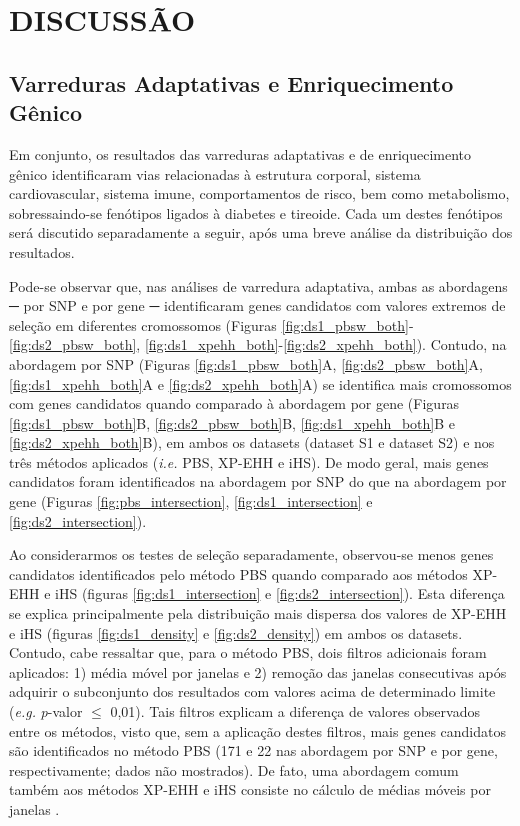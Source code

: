 
\clearpage
\section{DISCUSSÃO}
\label{sec:amazonia_discussion}

\subsection{Varreduras Adaptativas e Enriquecimento Gênico}

Em conjunto, os resultados das varreduras adaptativas e de enriquecimento gênico identificaram vias relacionadas à estrutura corporal, sistema cardiovascular, sistema imune, comportamentos de risco, bem como metabolismo, sobressaindo-se fenótipos ligados à diabetes e tireoide. Cada um destes fenótipos será discutido separadamente a seguir, após uma breve análise da distribuição dos resultados.

Pode-se observar que, nas análises de varredura adaptativa, ambas as abordagens ─ por SNP e por gene ─ identificaram genes candidatos com valores extremos de seleção em diferentes cromossomos (Figuras \ref{fig:ds1_pbsw_both}-\ref{fig:ds2_pbsw_both}, \ref{fig:ds1_xpehh_both}-\ref{fig:ds2_xpehh_both}). Contudo, na abordagem por SNP (Figuras \ref{fig:ds1_pbsw_both}A, \ref{fig:ds2_pbsw_both}A, \ref{fig:ds1_xpehh_both}A e \ref{fig:ds2_xpehh_both}A) se identifica mais cromossomos com genes candidatos quando comparado à abordagem por gene (Figuras \ref{fig:ds1_pbsw_both}B, \ref{fig:ds2_pbsw_both}B, \ref{fig:ds1_xpehh_both}B e \ref{fig:ds2_xpehh_both}B), em ambos os datasets (dataset S1 e dataset S2) e nos três métodos aplicados (\emph{i.e.} PBS, XP-EHH e iHS). De modo geral, mais genes candidatos foram identificados na abordagem por SNP do que na abordagem por gene (Figuras \ref{fig:pbs_intersection}, \ref{fig:ds1_intersection} e \ref{fig:ds2_intersection}).

Ao considerarmos os testes de seleção separadamente, observou-se menos genes candidatos identificados pelo método PBS quando comparado aos métodos XP-EHH e iHS (figuras \ref{fig:ds1_intersection} e \ref{fig:ds2_intersection}). Esta diferença se explica principalmente pela distribuição mais dispersa dos valores de XP-EHH e iHS (figuras \ref{fig:ds1_density} e \ref{fig:ds2_density}) em ambos os datasets. Contudo, cabe ressaltar que, para o método PBS, dois filtros adicionais foram aplicados: 1) média móvel por janelas e 2) remoção das janelas consecutivas após adquirir o subconjunto dos resultados com valores acima de determinado limite (\emph{e.g.} \emph{p}-valor $\leq$ 0,01). Tais filtros explicam a diferença de valores observados entre os métodos, visto que, sem a aplicação destes filtros, mais genes candidatos são identificados no método PBS (171 e 22 nas abordagem por SNP e por gene, respectivamente; dados não mostrados). De fato, uma abordagem comum também aos métodos XP-EHH e iHS consiste no cálculo de médias móveis por janelas \cite{szpiech_selscan_2014,gautier_rehh_2017}.

